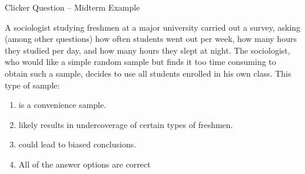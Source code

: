 \documentclass{beamer}
\begin{document}
\begin{frame}{Clicker Question -- Midterm Example}
	
	A sociologist studying freshmen at a major university carried out a survey, asking (among other
	questions) how often students went out per week, how many hours they studied per day, and
	how many hours they slept at night. The sociologist, who would like a simple random sample
	but finds it too time consuming to obtain such a sample, decides to use all students enrolled in
	his own class. This type of sample:
	\begin{enumerate}[label=(\alph*)]
		\item is a convenience sample.
		\item likely results in undercoverage of certain types of freshmen.
		\item could lead to biased conclusions.
		\item All of the answer options are correct
	\end{enumerate}
\end{frame}
\end{document}
